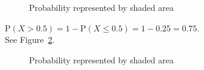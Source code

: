 \documentclass[
  letterpaper,
  DIV=11,
  numbers=noendperiod]{scrreprt}
\begin{document}
\begin{figure}


\caption{\label{fig-plot113}Probability represented by shaded area}

\end{figure}%

\(\mbox{P}(X > 0.5) = 1-\mbox{P}(X\leq 0.5)=1-0.25 = 0.75\).\\
See Figure~\ref{fig-plot114}.

\begin{figure}


\caption{\label{fig-plot114}Probability represented by shaded area}

\end{figure}%
\end{document}
